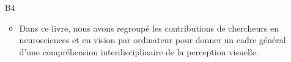 \begin{enumerate}
%

\item[B4] 
\begin{itemize}
  \item Dans ce livre, nous avons regroupé les contributions de chercheurs en neurosciences et en vision par ordinateur pour donner un cadre général d'une compréhension interdisciplinaire de la perception visuelle.
\end{itemize}

 \end{enumerate}

